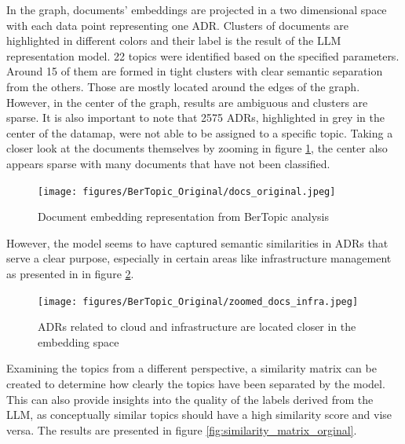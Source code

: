         In the graph, documents' embeddings are projected in a two dimensional space with each data point representing one ADR. Clusters of documents are highlighted in different colors and their label is the result of the LLM representation model. 22 topics were identified based on the specified parameters. Around 15 of them are formed in tight clusters with clear semantic separation from the others. Those are mostly located around the edges of the graph. However, in the center of the graph, results are ambiguous and clusters are sparse. It is also important to note that 2575 ADRs, highlighted in grey in the center of the datamap, were not able to be assigned to a specific topic. Taking a closer look at the documents themselves by zooming in figure \ref{fig:docs_original}, the center also appears sparse with many documents that have not been classified. 
        
        \begin{figure}[h]
            \centering
            \texttt{[image: figures/BerTopic\_Original/docs\_original.jpeg]}
            \caption{Document embedding representation from BerTopic analysis}
            \label{fig:docs_original}
        \end{figure}
        
        However, the model seems to have captured semantic similarities in ADRs that serve a clear purpose, especially in certain areas like infrastructure management as presented in in figure \ref{fig:infra_docs}.

        \begin{figure}[h]
            \centering
            \texttt{[image: figures/BerTopic\_Original/zoomed\_docs\_infra.jpeg]}
            \caption{ADRs related to cloud and infrastructure are located  closer in the embedding space}
            \label{fig:infra_docs}
        \end{figure}
        
        Examining the topics from a different perspective, a similarity matrix can be created to determine how clearly the topics have been separated by the model. This can also provide insights into the quality of the labels derived from the LLM, as conceptually similar topics should have a high similarity score and vise versa. The results are presented in figure \ref{fig:similarity_matrix_orginal}. 
        
